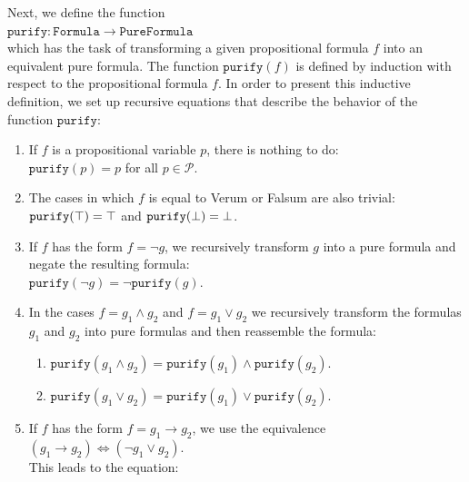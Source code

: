 Next, we define the function
\\[0.2cm]
\hspace*{1.3cm}
$\texttt{purify}: \texttt{Formula} \rightarrow \texttt{PureFormula}$
\\[0.2cm]
which has the task of transforming a given propositional formula $f$ into an equivalent pure formula.
The function $\texttt{purify}(f)$ is defined by induction with respect to the propositional formula $f$.
In order to present this inductive definition, we set up recursive equations
that describe the behavior of the function $\texttt{purify}$:
\begin{enumerate}
\item If $f$ is a propositional variable $p$, there is nothing to do:
      \\[0.2cm]
      \hspace*{1.3cm}
      $\texttt{purify}(p) = p$ \quad for all $p \in \mathcal{P}$.
\item The cases in which $f$ is equal to Verum or  Falsum are also trivial:
      \\[0.2cm]
      \hspace*{1.3cm}
      $\texttt{purify}(\top) = \top$ \quad and \quad
      $\texttt{purify}(\bot) = \bot$.
\item If $f$ has the form $f = \neg g$, we recursively transform $g$ into a pure formula and negate the
      resulting formula: \\[0.2cm]
      \hspace*{1.3cm}
      $\texttt{purify}(\neg g) = \neg \texttt{purify}(g)$.
\item In the cases $f = g_1 \wedge g_2$ and $f = g_1 \vee g_2$ we recursively transform the formulas $g_1$
      and $g_2$ into pure formulas and then reassemble the formula:
      \begin{enumerate}
      \item $\texttt{purify}(g_1 \wedge g_2) = \texttt{purify}(g_1) \wedge \texttt{purify}(g_2)$.
      \item $\texttt{purify}(g_1 \vee g_2) = \texttt{purify}(g_1) \vee \texttt{purify}(g_2)$.
      \end{enumerate}
\item If $f$ has the form $f = g_1 \rightarrow g_2$, we use the
      equivalence \\[0.2cm]
      \hspace*{1.3cm}
      $(g_1 \rightarrow g_2) \Leftrightarrow (\neg g_1 \vee g_2)$.
      \\[0.2cm]
      This leads to the equation:

\end{enumerate}
